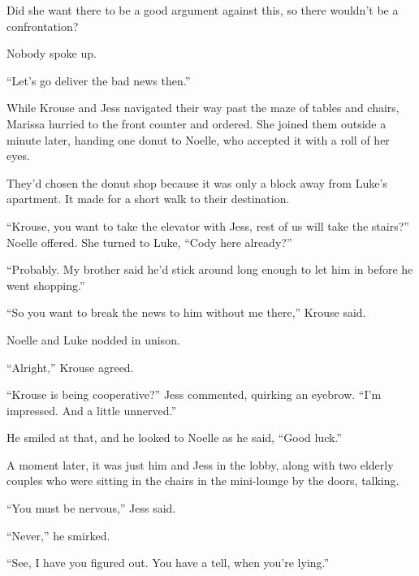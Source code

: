 Did she want there to be a good argument against this, so there wouldn't be a confrontation?



Nobody spoke up.



``Let's go deliver the bad news then.''



While Krouse and Jess navigated their way past the maze of tables and chairs, Marissa hurried to the front counter and ordered.  She joined them outside a minute later, handing one donut to Noelle, who accepted it with a roll of her eyes.



They'd chosen the donut shop because it was only a block away from Luke's apartment.  It made for a short walk to their destination.



``Krouse, you want to take the elevator with Jess, rest of us will take the stairs?''  Noelle offered.  She turned to Luke, ``Cody here already?''



``Probably.  My brother said he'd stick around long enough to let him in before he went shopping.''



``So you want to break the news to him without me there,'' Krouse said.



Noelle and Luke nodded in unison.



``Alright,'' Krouse agreed.



``Krouse is being cooperative?''  Jess commented, quirking an eyebrow.  ``I'm impressed.  And a little unnerved.''



He smiled at that, and he looked to Noelle as he said, ``Good luck.''



A moment later, it was just him and Jess in the lobby, along with two elderly couples who were sitting in the chairs in the mini-lounge by the doors, talking.



``You must be nervous,'' Jess said.



``Never,'' he smirked.



``See, I have you figured out.  You have a tell, when you're lying.''



